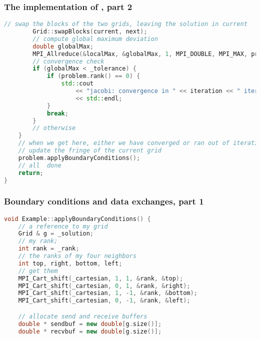 \begin{frame}[fragile]
%
  \frametitle{The implementation of , part 2}
%
  \begin{lstlisting}[language=c++,name=mpi:solver,basicstyle=\tt\bfseries\tiny]
        // swap the blocks of the two grids, leaving the solution in current
        Grid::swapBlocks(current, next);
        // compute global maximum deviation
        double globalMax;
        MPI_Allreduce(&localMax, &globalMax, 1, MPI_DOUBLE, MPI_MAX, problem.communicator());
        // convergence check
        if (globalMax < _tolerance) {
            if (problem.rank() == 0) {
                std::cout 
                    << "jacobi: convergence in " << iteration << " iterations"
                    << std::endl;
            }
            break;
        }
        // otherwise
    }
    // when we get here, either we have converged or ran out of iterations
    // update the fringe of the current grid
    problem.applyBoundaryConditions();
    // all  done
    return;
}
  \end{lstlisting}
% 
\end{frame}

\begin{frame}[fragile]
%
  \frametitle{Boundary conditions and data exchanges, part 1}
%
  \begin{lstlisting}[language=c++,name=mpi:example-impl]
void Example::applyBoundaryConditions() {
    // a reference to my grid
    Grid & g = _solution;
    // my rank;
    int rank = _rank;
    // the ranks of my four neighbors
    int top, right, bottom, left;
    // get them
    MPI_Cart_shift(_cartesian, 1, 1, &rank, &top);
    MPI_Cart_shift(_cartesian, 0, 1, &rank, &right);
    MPI_Cart_shift(_cartesian, 1, -1, &rank, &bottom);
    MPI_Cart_shift(_cartesian, 0, -1, &rank, &left);

    // allocate send and receive buffers
    double * sendbuf = new double[g.size()];
    double * recvbuf = new double[g.size()];
  \end{lstlisting}
% 
\end{frame}

